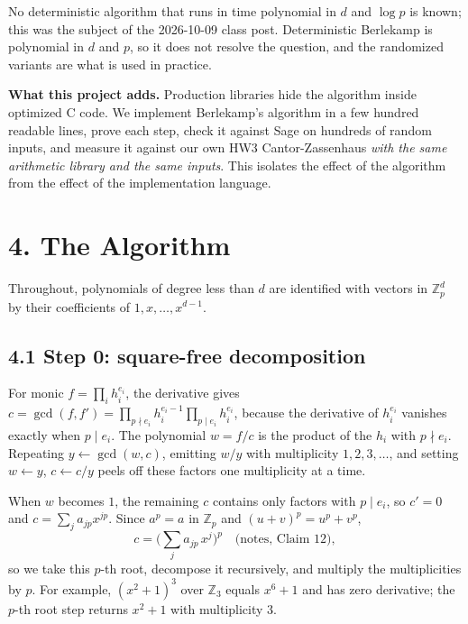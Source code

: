 \documentclass[11pt,a4paper]{article}
\newcommand{\Zp}{\mathbb{Z}_p}
\begin{document}
No deterministic algorithm that runs in time polynomial in $d$ and $\log p$ is known; this was
the subject of the 2026-10-09 class post. Deterministic Berlekamp is polynomial in $d$ and $p$,
so it does not resolve the question, and the randomized variants are what is used in practice.

\textbf{What this project adds.} Production libraries hide the algorithm inside optimized C code.
We implement Berlekamp's algorithm in a few hundred readable lines, prove each step, check it
against Sage on hundreds of random inputs, and measure it against our own HW3 Cantor-Zassenhaus
\emph{with the same arithmetic library and the same inputs}. This isolates the effect of the
algorithm from the effect of the implementation language.

\section*{4. The Algorithm}

Throughout, polynomials of degree less than $d$ are identified with vectors in $\Zp^d$ by their
coefficients of $1, x, \dots, x^{d-1}$.

\subsection*{4.1 Step 0: square-free decomposition}

For monic $f = \prod_i h_i^{e_i}$, the derivative gives
$c = \gcd(f, f') = \prod_{p \nmid e_i} h_i^{e_i - 1} \prod_{p \mid e_i} h_i^{e_i}$, because the
derivative of $h_i^{e_i}$ vanishes exactly when $p \mid e_i$. The polynomial $w = f/c$ is the
product of the $h_i$ with $p \nmid e_i$. Repeating $y \leftarrow \gcd(w, c)$, emitting $w/y$
with multiplicity $1, 2, 3, \dots$, and setting $w \leftarrow y$, $c \leftarrow c/y$ peels off
these factors one multiplicity at a time.

When $w$ becomes $1$, the remaining $c$ contains only factors with $p \mid e_i$, so $c' = 0$ and
$c = \sum_j a_{jp} x^{jp}$. Since $a^p = a$ in $\Zp$ and $(u+v)^p = u^p + v^p$,
\[
  c = \Big( \sum_j a_{jp}\, x^{j} \Big)^{p} \quad \text{(notes, Claim 12)},
\]
so we take this $p$-th root, decompose it recursively, and multiply the multiplicities by $p$.
For example, $(x^2+1)^3$ over $\mathbb{Z}_3$ equals $x^6 + 1$ and has zero derivative; the
$p$-th root step returns $x^2 + 1$ with multiplicity $3$.
\end{document}
